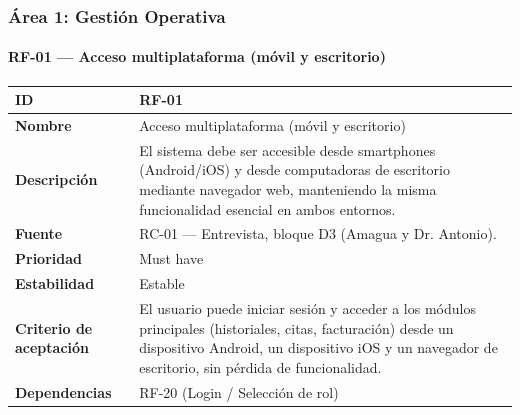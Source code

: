 \subsubsection{Área 1: Gestión
Operativa}\label{uxe1rea-1-gestiuxf3n-operativa}

\paragraph{RF-01 --- Acceso multiplataforma (móvil y
escritorio)}\label{rf-01-acceso-multiplataforma-muxf3vil-y-escritorio}

{\def\LTcaptype{none} %
\begin{longtable}[]{@{}
  >{\raggedright\arraybackslash}p{}
  >{\raggedright\arraybackslash}p{}@{}}
\toprule\noalign{}
\begin{minipage}[b]{\linewidth}\raggedright
\textbf{ID}
\end{minipage} & \begin{minipage}[b]{\linewidth}\raggedright
RF-01
\end{minipage} \\
\midrule\noalign{}
\endhead
\bottomrule\noalign{}
\endlastfoot
\textbf{Nombre} & \begin{minipage}[t]{\linewidth}\raggedright
Acceso multiplataforma (móvil y escritorio)
\end{minipage} \\
\textbf{Descripción} & \begin{minipage}[t]{\linewidth}\raggedright
El sistema debe ser accesible desde smartphones (Android/iOS) y desde
computadoras de escritorio mediante navegador web, manteniendo la misma funcionalidad esencial en ambos entornos.
\end{minipage} \\
\textbf{Fuente} & \begin{minipage}[t]{\linewidth}\raggedright
RC-01 --- Entrevista, bloque D3 (Amagua y Dr. Antonio).
\end{minipage} \\
\textbf{Prioridad} & \begin{minipage}[t]{\linewidth}\raggedright
Must have
\end{minipage} \\
\textbf{Estabilidad} & \begin{minipage}[t]{\linewidth}\raggedright
Estable
\end{minipage} \\
\textbf{Criterio de aceptación} &
\begin{minipage}[t]{\linewidth}\raggedright
El usuario puede iniciar sesión y acceder a los módulos principales
(historiales, citas, facturación) desde un dispositivo Android, un dispositivo iOS y
un navegador de escritorio, sin pérdida de funcionalidad.
\end{minipage} \\
\textbf{Dependencias} & \begin{minipage}[t]{\linewidth}\raggedright
RF-20 (Login / Selección de rol)
\end{minipage} \\
\end{longtable}
}

